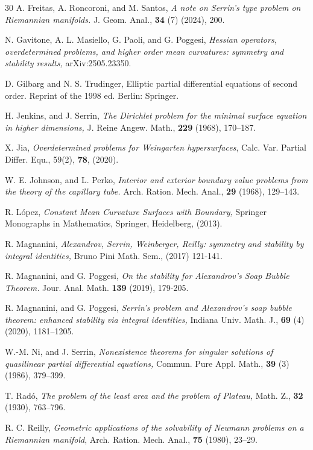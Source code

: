 \documentclass[12pt]{amsart}
\theoremstyle{plain}
\numberwithin{equation}{section}
\begin{document}
\begin{thebibliography}{30}
 A. Freitas, A. Roncoroni, and M. Santos, \emph{A note on Serrin’s type problem on Riemannian manifolds.} 
J. Geom. Anal., {\bf 34} (7) (2024), 200.

 N. Gavitone, A. L. Masiello, G. Paoli, and G. Poggesi, \emph{Hessian operators, overdetermined problems, and higher order mean curvatures: symmetry and stability results,} arXiv:2505.23350.

 D. Gilbarg and N. S. Trudinger, Elliptic partial differential equations of second order. Reprint of the 1998 ed. Berlin: Springer.


 H. Jenkins, and J. Serrin, \emph{The Dirichlet problem for the minimal surface equation in higher
dimensions,} J. Reine Angew. Math., {\bf 229} (1968), 170--187.


X. Jia, \emph{Overdetermined problems for Weingarten hypersurfaces}, Calc. Var. Partial Differ. Equ., 59(2), {\bf 78}, (2020).

 W. E. Johnson, and L. Perko,
\emph{Interior and exterior boundary value problems from the theory of the capillary tube.} Arch. Ration. Mech. Anal., {\bf29} (1968), 129--143.

 R. López, \emph{Constant Mean Curvature Surfaces with Boundary,} Springer Monographs in Mathematics, Springer, Heidelberg, (2013).

 R. Magnanini, \emph{Alexandrov, Serrin, Weinberger, Reilly: symmetry and stability by integral identities,} Bruno Pini Math. Sem., (2017) 121-141. 

 R. Magnanini, and G. Poggesi, \emph{On the stability for Alexandrov’s Soap Bubble Theorem.} Jour. Anal. Math. {\bf 139} (2019),
179-205.



 R. Magnanini, and G. Poggesi, \emph{Serrin's problem and Alexandrov's soap bubble theorem: enhanced stability via integral identities,} Indiana Univ. Math. J., {\bf 69} (4) (2020), 1181–1205.


W.-M. Ni, and J. Serrin,
\emph{Nonexistence theorems for singular solutions of quasilinear partial differential equations,}
Commun. Pure Appl. Math., {\bf 39} (3) (1986), 379--399.

 T. Radó,\emph{ The problem of the least area and the problem of Plateau,} Math. Z., {\bf 32} (1930), 763--796.


 R. C. Reilly,
\emph{Geometric applications of the solvability of Neumann problems on a Riemannian manifold}, Arch. Ration. Mech. Anal., {\bf 75} (1980), 23--29.



\end{thebibliography}
\end{document}
